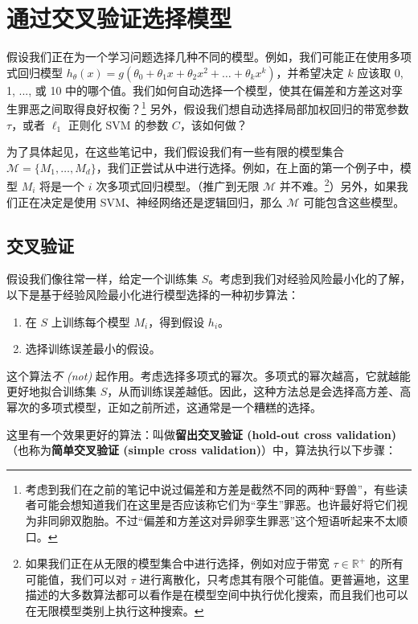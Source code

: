 \section{通过交叉验证选择模型}\label{sec:9.3}

假设我们正在为一个学习问题选择几种不同的模型。例如，我们可能正在使用多项式回归模型 $h_\theta(x) = g(\theta_0 + \theta_1 x + \theta_2 x^2 + \dots + \theta_k x^k)$，并希望决定 $k$ 应该取 0, 1, ..., 或 10 中的哪个值。我们如何自动选择一个模型，使其在偏差和方差这对孪生罪恶之间取得良好权衡？\footnote{考虑到我们在之前的笔记中说过偏差和方差是截然不同的两种“野兽”，有些读者可能会想知道我们在这里是否应该称它们为“孪生”罪恶。也许最好将它们视为非同卵双胞胎。不过“偏差和方差这对异卵孪生罪恶”这个短语听起来不太顺口。} 另外，假设我们想自动选择局部加权回归的带宽参数 $\tau$，或者 $\ell_1$ 正则化 SVM 的参数 $C$，该如何做？

为了具体起见，在这些笔记中，我们假设我们有一些有限的模型集合 $\mathcal{M} = \{M_1, \dots, M_d\}$，我们正尝试从中进行选择。例如，在上面的第一个例子中，模型 $M_i$ 将是一个 $i$ 次多项式回归模型。（推广到无限 $\mathcal{M}$ 并不难。\footnote{如果我们正在从无限的模型集合中进行选择，例如对应于带宽 $\tau \in \mathbb{R}^+$ 的所有可能值，我们可以对 $\tau$ 进行离散化，只考虑其有限个可能值。更普遍地，这里描述的大多数算法都可以看作是在模型空间中执行优化搜索，而且我们也可以在无限模型类别上执行这种搜索。}）另外，如果我们正在决定是使用 SVM、神经网络还是逻辑回归，那么 $\mathcal{M}$ 可能包含这些模型。

\subsection*{交叉验证}

假设我们像往常一样，给定一个训练集 $S$。考虑到我们对经验风险最小化的了解，以下是基于经验风险最小化进行模型选择的一种初步算法：

\begin{enumerate}
    \item 在 $S$ 上训练每个模型 $M_i$，得到假设 $h_i$。
    \item 选择训练误差最小的假设。
\end{enumerate}

这个算法\textit{不 (not)} 起作用。考虑选择多项式的幂次。多项式的幂次越高，它就越能更好地拟合训练集 $S$，从而训练误差越低。因此，这种方法总是会选择高方差、高幂次的多项式模型，正如之前所述，这通常是一个糟糕的选择。

这里有一个效果更好的算法：叫做\textbf{留出交叉验证 (hold-out cross validation)}（也称为\textbf{简单交叉验证 (simple cross validation)}）中，算法执行以下步骤：

